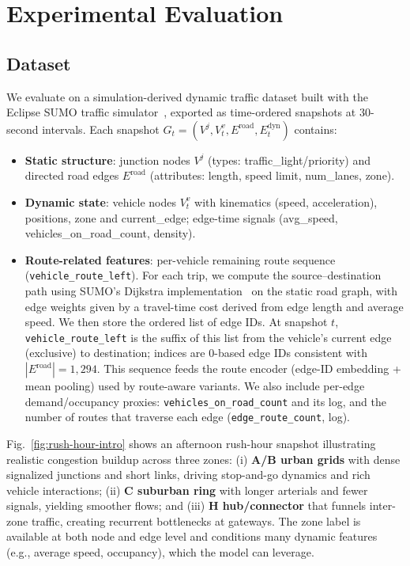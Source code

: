 \section{Experimental Evaluation}

\subsection{Dataset}
We evaluate on a simulation-derived dynamic traffic dataset built with the Eclipse SUMO traffic simulator~\cite{SUMO2018}, exported as time-ordered snapshots at 30-second intervals. Each snapshot $G_t=(V^j, V_t^v, E^{\mathrm{road}}, E_t^{\mathrm{dyn}})$ contains:
\begin{itemize}
    \item \textbf{Static structure}: junction nodes $V^j$ (types: traffic\_light/priority) and directed road edges $E^{\mathrm{road}}$ (attributes: length, speed limit, num\_lanes, zone).
    \item \textbf{Dynamic state}: vehicle nodes $V_t^v$ with kinematics (speed, acceleration), positions, zone and current\_edge; edge-time signals (avg\_speed, vehicles\_on\_road\_count, density).
    \item \textbf{Route-related features}: per-vehicle remaining route sequence (\texttt{vehicle\_route\_left}). For each trip, we compute the source--destination path using SUMO's Dijkstra implementation~\cite{SUMO2018,dijkstra1959} on the static road graph, with edge weights given by a travel-time cost derived from edge length and average speed. We then store the ordered list of edge IDs. At snapshot $t$, \texttt{vehicle\_route\_left} is the suffix of this list from the vehicle's current edge (exclusive) to destination; indices are 0-based edge IDs consistent with \(|E^{\mathrm{road}}|{=}1{,}294\). This sequence feeds the route encoder (edge-ID embedding + mean pooling) used by route-aware variants. We also include per-edge demand/occupancy proxies: \texttt{vehicles\_on\_road\_count} and its log, and the number of routes that traverse each edge (\texttt{edge\_route\_count}, log).
\end{itemize}
Fig.~\ref{fig:rush-hour-intro} shows an afternoon rush-hour snapshot illustrating realistic congestion buildup across three zones: (i) \textbf{A/B urban grids} with dense signalized junctions and short links, driving stop-and-go dynamics and rich vehicle interactions; (ii) \textbf{C suburban ring} with longer arterials and fewer signals, yielding smoother flows; and (iii) \textbf{H hub/connector} that funnels inter-zone traffic, creating recurrent bottlenecks at gateways. The zone label is available at both node and edge level and conditions many dynamic features (e.g., average speed, occupancy), which the model can leverage.



